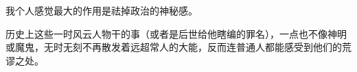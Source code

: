 \begin{zhihuanswer}
我个人感觉最大的作用是祛掉政治的神秘感。

历史上这些一时风云人物干的事（或者是后世给他瞎编的罪名），一点也不像神明或魔鬼，无时无刻不再散发着远超常人的大能，反而连普通人都能感受到他们的荒谬之处。
\end{zhihuanswer}
